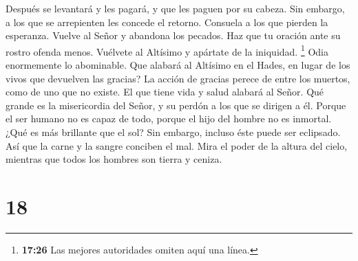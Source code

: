  Después se levantará y les pagará, y que les paguen por
su cabeza.  Sin embargo, a los que se arrepienten les
concede el retorno. Consuela a los que pierden la esperanza.
 Vuelve al Señor y abandona los pecados. Haz que tu
oración ante su rostro ofenda menos.  Vuélvete al
Altísimo y apártate de la iniquidad. \footnote{\textbf{17:26} Las
  mejores autoridades omiten aquí una línea.} Odia enormemente lo
abominable.  Que alabará al Altísimo en el Hades, en
lugar de los vivos que devuelven las gracias?  La acción
de gracias perece de entre los muertos, como de uno que no existe. El
que tiene vida y salud alabará al Señor.  Qué grande es
la misericordia del Señor, y su perdón a los que se dirigen a él.
 Porque el ser humano no es capaz de todo, porque el hijo
del hombre no es inmortal.  ¿Qué es más brillante que el
sol? Sin embargo, incluso éste puede ser eclipsado. Así que la carne y
la sangre conciben el mal.  Mira el poder de la altura
del cielo, mientras que todos los hombres son tierra y ceniza.

\hypertarget{section-17}{%
\section{18}\label{section-17}}

